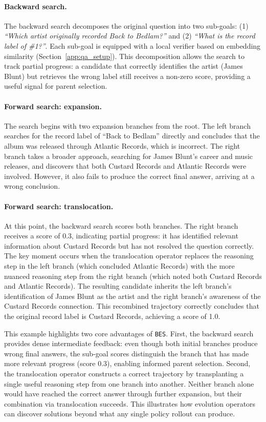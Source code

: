\documentclass{llmxive}
\providecommand{\ours}{\texttt{BES}}
\begin{document}
\paragraph{Backward search.} The backward search decomposes the original question into two sub-goals: (1) \textit{``Which artist originally recorded Back to Bedlam?''} and (2) \textit{``What is the record label of \#1?''}. Each sub-goal is equipped with a local verifier based on embedding similarity (Section~\ref{app:qa_setup}). This decomposition allows the search to track partial progress: a candidate that correctly identifies the artist (James Blunt) but retrieves the wrong label still receives a non-zero score, providing a useful signal for parent selection.

\paragraph{Forward search: expansion.} The search begins with two expansion branches from the root. The left branch searches for the record label of ``Back to Bedlam'' directly and concludes that the album was released through Atlantic Records, which is incorrect. The right branch takes a broader approach, searching for James Blunt's career and music releases, and discovers that both Custard Records and Atlantic Records were involved. However, it also fails to produce the correct final answer, arriving at a wrong conclusion.

\paragraph{Forward search: translocation.} At this point, the backward search scores both branches. The right branch receives a score of 0.3, indicating partial progress: it has identified relevant information about Custard Records but has not resolved the question correctly. The key moment occurs when the translocation operator replaces the reasoning step in the left branch (which concluded Atlantic Records) with the more nuanced reasoning step from the right branch (which noted both Custard Records and Atlantic Records). The resulting candidate inherits the left branch's identification of James Blunt as the artist and the right branch's awareness of the Custard Records connection. This recombined trajectory correctly concludes that the original record label is Custard Records, achieving a score of 1.0.

This example highlights two core advantages of \ours. First, the backward search provides dense intermediate feedback: even though both initial branches produce wrong final answers, the sub-goal scores distinguish the branch that has made more relevant progress (score 0.3), enabling informed parent selection. Second, the translocation operator constructs a correct trajectory by transplanting a single useful reasoning step from one branch into another. Neither branch alone would have reached the correct answer through further expansion, but their combination via translocation succeeds. This illustrates how evolution operators can discover solutions beyond what any single policy rollout can produce.
\end{document}
